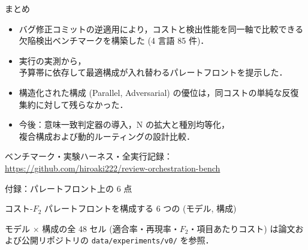 \documentclass[10pt, aspectratio=169, t]{beamer}
\begin{document}
\begin{frame}{まとめ}
    \begin{itemize}
        \item バグ修正コミットの逆適用により，\alert{コストと検出性能を同一軸で比較できる}\\欠陥検出ベンチマークを構築した (4 言語 85 件)．
        \item \nCombos{} 実行の実測から，\\予算帯に依存して最適構成が入れ替わるパレートフロントを提示した．
        \item 構造化された構成 (Parallel, Adversarial) の優位は，同コストの単純な反復集約に対して\alert{残らなかった}．
        \item 今後：意味一致判定器の導入，N の拡大と種別均等化，\\複合構成および動的ルーティングの設計比較．
    \end{itemize}

    \vfill
    \begin{minipage}[b]{0.74\textwidth}
        \scriptsize ベンチマーク・実験ハーネス・全実行記録：\\
        \url{https://github.com/hiroaki222/review-orchestration-bench}
    \end{minipage}\hfill
    \begin{minipage}[b]{0.20\textwidth}
        \raggedleft
    \end{minipage}
\end{frame}

\appendix

\begin{frame}[standout]
\end{frame}

\begin{frame}{付録：パレートフロント上の 6 点}
    \begin{center}
        \small コスト-$F_2$ パレートフロントを構成する 6 つの (モデル, 構成)\\[3pt]
        \footnotesize
        
    \end{center}

    \vspace{6pt}
    \scriptsize
    \nModels{} モデル $\times$ \nConfigs{} 構成の全 48 セル (適合率・再現率・$F_2$・項目あたりコスト) は論文および公開リポジトリの \texttt{data/experiments/v0/} を参照．
\end{frame}
\end{document}
